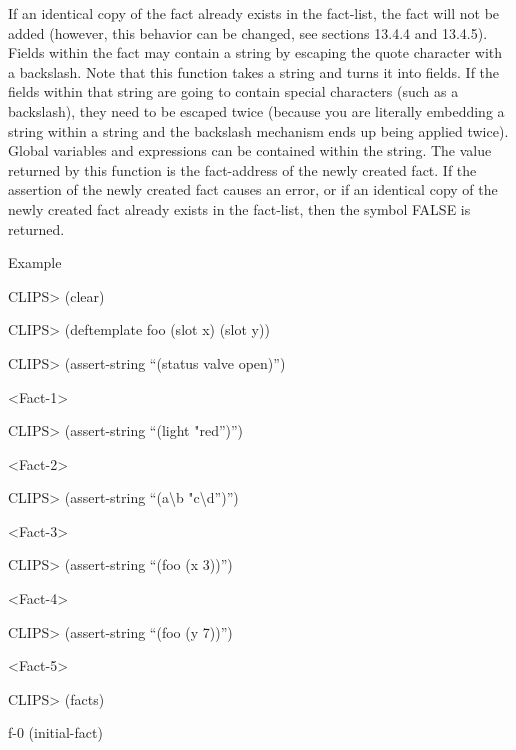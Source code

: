 \documentclass[letterpaper,10pt,english]{sphinxmanual}
\begin{document}

\begin{sphinxVerbatim}[commandchars=\\\{\}]
 
\end{sphinxVerbatim}

If an identical copy of the fact already exists in the fact-list, the
fact will not be added (however, this behavior can be changed, see
sections 13.4.4 and 13.4.5). Fields within the fact may contain a string
by escaping the quote character with a backslash. Note that this
function takes a string and turns it into fields. If the fields within
that string are going to contain special characters (such as a
backslash), they need to be escaped twice (because you are literally
embedding a string within a string and the backslash mechanism ends up
being applied twice). Global variables and expressions can be contained
within the string. The value returned by this function is the
fact-address of the newly created fact. If the assertion of the newly
created fact causes an error, or if an identical copy of the newly
created fact already exists in the fact-list, then the symbol FALSE is
returned.

Example

CLIPS\textgreater{} (clear)

CLIPS\textgreater{} (deftemplate foo (slot x) (slot y))

CLIPS\textgreater{} (assert-string “(status valve open)”)

\textless{}Fact-1\textgreater{}

CLIPS\textgreater{} (assert-string “(light "red”)”)

\textless{}Fact-2\textgreater{}

CLIPS\textgreater{} (assert-string “(a\textbackslash{}b "c\textbackslash{}d”)”)

\textless{}Fact-3\textgreater{}

CLIPS\textgreater{} (assert-string “(foo (x 3))”)

\textless{}Fact-4\textgreater{}

CLIPS\textgreater{} (assert-string “(foo (y 7))”)

\textless{}Fact-5\textgreater{}

CLIPS\textgreater{} (facts)

f-0 (initial-fact)
\end{document}
